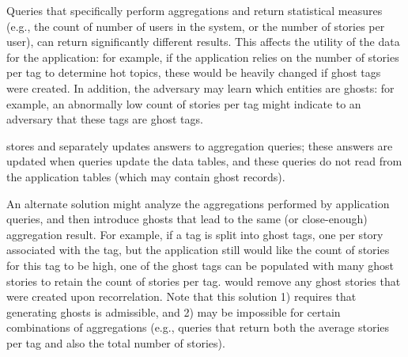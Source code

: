 Queries that specifically perform aggregations and return statistical measures (e.g.,
the count of number of users in the system, or the number of stories per user), can return
significantly different results. This affects the utility of the data for the application: for
example, if the application relies on the number of stories per tag to determine hot topics, these
would be heavily changed if ghost tags were created.  In addition, the adversary may learn which
entities are ghosts: for example, an abnormally low count of stories per tag might indicate to an
adversary that these tags are ghost tags.  

\sys stores and separately updates answers to aggregation queries;
these answers are updated when queries update the data tables, and these queries do not read from
the application tables (which may contain ghost records).

An alternate solution might analyze the aggregations performed by application queries, and then
introduce ghosts that lead to the same (or close-enough) aggregation result. For example, if a tag
is split into ghost tags, one per story associated with the tag, but the application still would
like the count of stories for this tag to be high, one of the ghost tags can be populated with many
ghost stories to retain the count of stories per tag.  \sys would remove any ghost stories that
were created upon recorrelation. Note that this solution 1) requires that generating ghosts is
admissible, and 2) may be impossible for certain combinations of aggregations (e.g., queries that
return both the average stories per tag and also the total number of stories).


\fi

